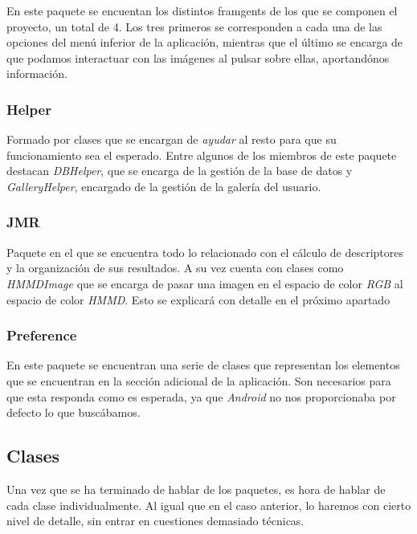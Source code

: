 En este paquete se encuentan los distintos framgents de los que se componen el proyecto, un total de 4. Los tres primeros se corresponden a cada una de las opciones del menú inferior de la aplicación, mientras que el último se encarga de que podamos interactuar con las imágenes al pulsar sobre ellas, aportandónos información.

\subsubsection{Helper}

Formado por clases que se encargan de \textit{ayudar} al resto para que su funcionamiento sea el esperado. Entre algunos de los miembros de este paquete destacan \textit{DBHelper}, que se encarga de la gestión de la base de datos y \textit{GalleryHelper}, encargado de la gestión de la galería del usuario.

\subsubsection{JMR}

Paquete en el que se encuentra todo lo relacionado con el cálculo de descriptores y la organización de sus resultados. A su vez cuenta con clases como \textit{HMMDImage} que se encarga de pasar una imagen en el espacio de color \textit{RGB} al espacio de color \textit{HMMD}. Esto se explicará con detalle en el próximo apartado

\subsubsection{Preference}

En este paquete se encuentran una serie de clases que representan los elementos que se encuentran en la sección adicional de la aplicación. Son necesarios para que esta responda como es esperada, ya que \textit{Android} no nos proporcionaba por defecto lo que buscábamos.

\subsection{Clases}

Una vez que se ha terminado de hablar de los paquetes, es hora de hablar de cada clase individualmente. Al igual que en el caso anterior, lo haremos con cierto nivel de detalle, sin entrar en cuestiones demasiado técnicas.\\

